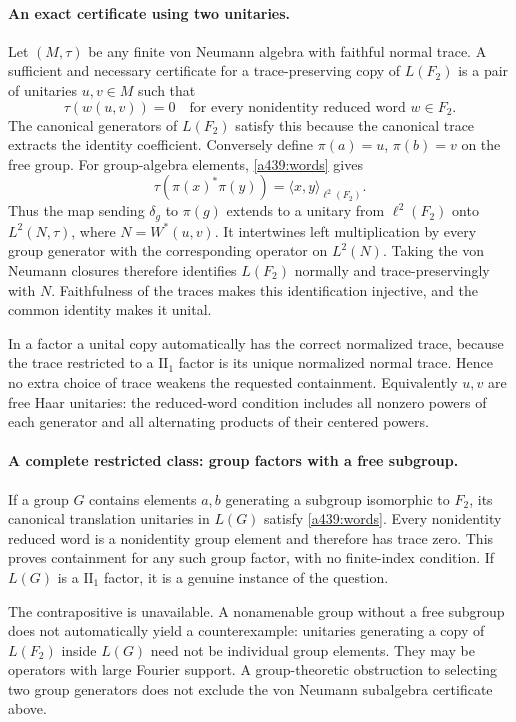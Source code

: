 \documentclass[11pt]{article}
\begin{document}
\paragraph{An exact certificate using two unitaries.}
Let $(M,\tau)$ be any finite von Neumann algebra with faithful normal
trace. A sufficient and necessary certificate for a trace-preserving
copy of $L(F_2)$ is a pair of unitaries $u,v\in M$ such that
\begin{equation}\label{a439:words}
 \tau(w(u,v))=0
 \quad\text{for every nonidentity reduced word }
 w\in F_2.
\end{equation}
The canonical generators of $L(F_2)$ satisfy this because the
canonical trace extracts the identity coefficient. Conversely define
$\pi(a)=u$, $\pi(b)=v$ on the free group. For group-algebra elements,
\eqref{a439:words} gives
\[
 \tau(\pi(x)^*\pi(y))=\langle x,y\rangle_{\ell^2(F_2)}.
\]
Thus the map sending $\delta_g$ to $\pi(g)$ extends to a unitary
from $\ell^2(F_2)$ onto $L^2(N,\tau)$, where $N=W^*(u,v)$.
It intertwines left multiplication by every group generator
with the corresponding operator on $L^2(N)$. Taking the von
Neumann closures therefore identifies $L(F_2)$ normally and
trace-preservingly with $N$. Faithfulness of the traces makes
this identification injective, and the common identity makes
it unital.

In a factor a unital copy automatically has the correct normalized
trace, because the trace restricted to a $\mathrm{II}_1$ factor
is its unique normalized normal trace. Hence no extra choice of
trace weakens the requested containment. Equivalently $u,v$ are
free Haar unitaries: the reduced-word condition includes all
nonzero powers of each generator and all alternating products
of their centered powers.

\paragraph{A complete restricted class: group factors with a free subgroup.}
If a group $G$ contains elements $a,b$ generating a subgroup
isomorphic to $F_2$, its canonical translation unitaries in
$L(G)$ satisfy \eqref{a439:words}. Every nonidentity reduced
word is a nonidentity group element and therefore has trace
zero. This proves containment for any such group factor,
with no finite-index condition. If $L(G)$ is a
$\mathrm{II}_1$ factor, it is a genuine instance of the question.

The contrapositive is unavailable. A nonamenable group without
a free subgroup does not automatically yield a counterexample:
unitaries generating a copy of $L(F_2)$ inside $L(G)$ need
not be individual group elements. They may be operators
with large Fourier support. A group-theoretic obstruction
to selecting two group generators does not exclude the
von Neumann subalgebra certificate above.
\end{document}
